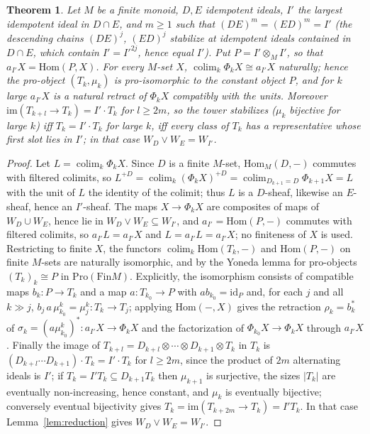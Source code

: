 \documentclass[11pt]{amsart}
\newtheorem{thm}{Theorem}[section]
\theoremstyle{definition}
\newcommand{\Hom}{\mathrm{Hom}}
\begin{document}
\begin{thm}\label{thm:essconst}
Let $M$ be a finite monoid, $D,E$ idempotent ideals, $I'$ the largest
idempotent ideal in $D\cap E$, and $m\ge1$ such that $(DE)^m=(ED)^m=I'$ (the
descending chains $(DE)^j$, $(ED)^j$ stabilize at idempotent ideals contained in
$D\cap E$, which contain $I'=I'^{2j}$, hence equal $I'$). Put
$P=I'\otimes_MI'$, so that $a_{I'}X=\Hom(P,X)$. For every $M$-set $X$,
$\operatorname{colim}_k\Phi_kX\cong a_{I'}X$ naturally; hence the pro-object
$(T_k,\mu_k)$ is pro-isomorphic to the constant object $P$, and for $k$ large
$a_{I'}X$ is a natural retract of $\Phi_kX$ compatibly with the units. Moreover
$\mathrm{im}(T_{k+l}\to T_k)=I'\cdot T_k$ for $l\ge2m$, so the tower stabilizes
($\mu_k$ bijective for large $k$) iff $T_k=I'\cdot T_k$ for large $k$, iff every
class of $T_k$ has a representative whose first slot lies in $I'$; in that case
$W_D\vee W_E=W_{I'}$.
\end{thm}
\begin{proof}
Let $L=\operatorname{colim}_k\Phi_kX$. Since $D$ is a finite $M$-set,
$\Hom_M(D,-)$ commutes with filtered colimits, so
$L^{+D}=\operatorname{colim}_k(\Phi_kX)^{+D}=\operatorname{colim}_{D_{k+1}=D}\Phi_{k+1}X=L$
with the unit of $L$ the identity of the colimit; thus $L$ is a $D$-sheaf,
likewise an $E$-sheaf, hence an $I'$-sheaf. The maps $X\to\Phi_kX$ are composites of maps of
$W_D\cup W_E$, hence lie in $W_D\vee W_E\subseteq W_{I'}$, and $a_{I'}=\Hom(P,-)$ commutes with filtered
colimits, so $a_{I'}L=a_{I'}X$ and $L=a_{I'}L=a_{I'}X$; no finiteness of $X$ is
used. Restricting to finite $X$, the functors
$\operatorname{colim}_k\Hom(T_k,-)$ and $\Hom(P,-)$ on finite $M$-sets are naturally
isomorphic, and by the Yoneda lemma for pro-objects $(T_k)_k\cong P$ in
$\mathrm{Pro}(\mathrm{Fin}M)$. Explicitly, the isomorphism consists of compatible maps
$b_k\colon P\to T_k$ and a map $a\colon T_{k_0}\to P$ with $ab_{k_0}=\mathrm{id}_P$
and, for each $j$ and all $k\gg j$, $b_j\,a\,\mu^k_{k_0}=\mu^k_j\colon T_k\to T_j$;
applying $\Hom(-,X)$ gives the retraction $\rho_k=b_k^*$ of
$\sigma_k=(a\mu^k_{k_0})^*\colon a_{I'}X\to\Phi_kX$ and the factorization of
$\Phi_{k_0}X\to\Phi_kX$ through $a_{I'}X$. Finally the image of
$T_{k+l}=D_{k+l}\otimes\cdots\otimes D_{k+1}\otimes T_k$ in $T_k$ is
$(D_{k+l}\cdots D_{k+1})\cdot T_k=I'\cdot T_k$ for $l\ge2m$, since the product of
$2m$ alternating ideals is $I'$; if $T_k=I'T_k\subseteq D_{k+1}T_k$ then
$\mu_{k+1}$ is surjective, the sizes $|T_k|$ are eventually non-increasing, hence
constant, and $\mu_k$ is eventually bijective; conversely eventual bijectivity
gives $T_k=\mathrm{im}(T_{k+2m}\to T_k)=I'T_k$. In that case
Lemma~\ref{lem:reduction} gives $W_D\vee W_E=W_{I'}$.
\end{proof}
\end{document}
